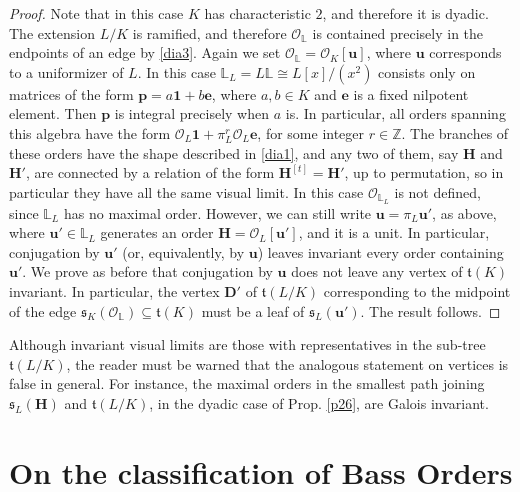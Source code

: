 \documentclass{amsart}
\theoremstyle{definition}
\newcommand\lu{\mathbb{L}}
\newcommand\oink{\mathcal O}
\newcommand\Da{\mathbf{D}}
\newcommand\Ha{\mathbf{H}}
\begin{document}
\begin{proof}
    Note that in this case $K$ has characteristic $2$, 
    and therefore it is dyadic. The extension $L/K$
    is ramified, and therefore $\oink_{\lu}$ is
    contained precisely in the endpoints of an edge by
    \ref{dia3}. Again we set $\oink_{\lu}=
    \mathcal{O}_K[\mathbf{u}]$, where $\mathbf{u}$
    corresponds to a uniformizer of $L$.
    In this case $\lu_L=L\lu\cong 
    L[x]/(x^2)$ consists only on matrices 
    of the form $\mathbf{p}=
    a\mathbf{1}+b\mathbf{e}$, where $a,b\in K$ and
    $\mathbf{e}$ is a fixed nilpotent element.
    Then $\mathbf{p}$ is integral precisely when
    $a$ is.
    In particular, all orders spanning 
    this algebra 
    have the form 
    $\mathcal{O}_L\mathbf{1}+
    \pi_L^r\mathcal{O}_L\mathbf{e}$,
    for some integer $r\in\mathbb{Z}$. The
    branches of these orders have the 
    shape described
    in \ref{dia1}, and any two of them, say $\Ha$ and $\Ha'$,
    are connected by a relation of the form $\Ha^{[t]}=\Ha'$,
    up to permutation, so in particular they have all the 
    same visual limit.
    In this case $\oink_{\lu_L}$ is not 
    defined, since $\lu_L$ has no maximal order. 
    However, we can still 
    write $\mathbf{u}=\pi_L\mathbf{u}'$, as above, 
    where $\mathbf{u}'\in\lu_L$
    generates an order $\Ha=\mathcal{O}_L[\mathbf{u}']$, 
    and it is a unit. In particular, conjugation by
    $\mathbf{u}'$ (or, equivalently, by $\mathbf{u}$) leaves
    invariant every order containing $\mathbf{u}'$.
    We prove as before that conjugation by $\mathbf{u}$ does
    not leave any vertex of $\mathfrak{t}(K)$ 
    invariant.
    In particular, the vertex $\Da'$ of
    $\mathfrak{t}(L/K)$ corresponding to the 
    midpoint
    of the edge $\mathfrak{s}_K(\mathcal{O}_{\lu})
    \subseteq\mathfrak{t}(K)$ must be a leaf of
    $\mathfrak{s}_L(\mathbf{u}')$. The result 
    follows.


\end{proof}

Although invariant visual limits are 
those with representatives in the sub-tree
$\mathfrak{t}(L/K)$, the reader must be warned
that the analogous statement on vertices is false 
in general. For instance, the maximal
orders in the smallest path joining 
$\mathfrak{s}_L(\Ha)$ and
$\mathfrak{t}(L/K)$, in the dyadic case 
of Prop. \ref{p26}, are Galois invariant.

\section{On the classification of Bass Orders}
\end{document}

